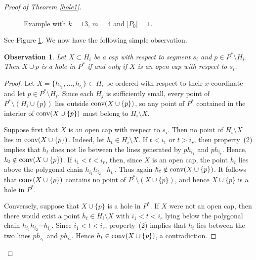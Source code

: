 \documentclass[10pt,a4paper]{amsart}
\newtheorem{observation}{Observation}
\def\conv{\mbox{\rm conv}}
\begin{document}
\begin{proof}[Proof of Theorem \ref{hole1}]
    \begin{figure}
        \centering
        
        \caption{Example with $k = 13$, $m = 4$ and $|P_0| = 1$.}
        \label{fig:const}
    \end{figure}

    

\noindent See Figure \ref{fig:const}.   We now have the following simple observation.



\begin{observation}\label{clean}
    Let $X \subset H_i$ be a cap with respect to segment $s_i$ and $p \in P^{\ast}\setminus H_i$.  Then $X\cup p$ is a hole in $P^{\ast}$ if and only if $X$ is an open cap with respect to $s_i$.  
\end{observation}




\begin{proof}
Let $X=\{h_{i_1},\ldots,h_{i_r}\}\subset H_i$ be ordered with respect to their \(x\)-coordinate and let $p \in P^{\ast}\setminus H_i$.  Since each $H_j$ is sufficiently small,  every point of \(P^{\ast}\setminus (H_i\cup \{p\})\) lies outside \(\conv(X\cup\{p\})\), so any point of \(P^{\ast}\) contained in the interior of \(\conv(X\cup\{p\})\) must belong to \(H_i\setminus X\).

 

Suppose first that \(X\) is an open cap with respect to \(s_i\). Then no point of \(H_i\setminus X\) lies in \(\conv(X\cup\{p\})\). Indeed, let \(h_t\in H_i\setminus X\). If \(t<i_1\) or \(t>i_r\), then property~(2) implies that \(h_t\) does not lie between the lines generated by \(ph_{i_1}\) and \(ph_{i_r}\).  Hence, \(h_t\notin \conv(X\cup\{p\})\). If \(i_1<t<i_r\), then, since \(X\) is an open cap, the point \(h_t\) lies above the polygonal chain \(h_{i_1}h_{i_2}\cdots h_{i_r}\). Thus again \(h_t\notin \conv(X\cup\{p\})\). It follows that \(\conv(X\cup\{p\})\) contains no point of \(P^{\ast}\setminus (X\cup\{p\})\), and hence \(X\cup\{p\}\) is a hole in \(P^{\ast}\).

Conversely, suppose that \(X\cup\{p\}\) is a hole in \(P^{\ast}\). If \(X\) were not an open cap, then there would exist a point
\(h_t\in H_i\setminus X\) with \(i_1<t<i_r\) lying below the polygonal chain
\(h_{i_1}h_{i_2}\cdots h_{i_r}\).
Since \(i_1<t<i_r\), property~(2) implies that \(h_t\) lies between the two
lines \(ph_{i_1}\) and \(ph_{i_r}\).
Hence \(h_t\in \conv(X\cup\{p\})\), a contradiction.\end{proof}
















\end{proof}
\end{document}
